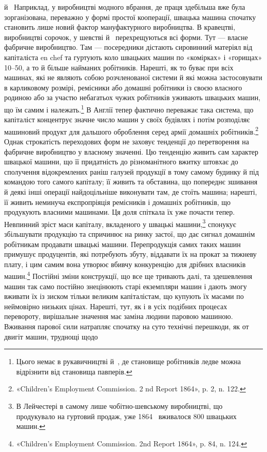 \parcont{}  %
й~ Наприклад, у виробництві модного вбрання, де праця
здебільша вже була зорганізована, переважно у формі простої
кооперації, швацька машина спочатку становить лише новий
фактор мануфактурного виробництва. В кравецтві, виробництві
сорочок, у шевстві й~ перехрещуються всі форми. Тут —
власне фабричне виробництво. Там — посередники дістають сировинний
матеріял від капіталіста en chef та гуртують коло швацьких
машин по «комірках» і «горищах» 10--50, а то й більше найманих
робітників. Нарешті, як то буває при всіх машинах, які не
являють собою розчленованої системи й які можна застосовувати
в карликовому розмірі, ремісники або домашні робітники із
своєю власного родиною або за участю небагатьох чужих робітників
уживають швацьких машин, що їм самим і належать.\footnote{
Цього немає в рукавичництві й~, де становище робітників
ледве можна відрізнити від становища павперів.
}
В Англії тепер фактично переважає така система, що капіталіст
концентрує значне число машин у своїх будівлях і потім розподіляє
машиновий продукт для дальшого оброблення серед армії
домашніх робітників.\footnote{
«Children’s Employment Commission. 2 nd Report 1864», p. 2,
n. 122.
} Однак строкатість переходових форм
не заховує тенденції до перетворення на фабричне виробництво
у власному значенні. Цю тенденцію живить сам характер швацької
машини, що її придатність до різноманітного вжитку штовхає
до сполучення відокремлених раніш галузей продукції в
тому самому будинку й під командою того самого капіталу; її
живить та обставина, що попереднє зшивання й деякі інші операції
найдоцільніше виконувати там, де стоїть машина; нарешті,
її живить неминуча експропріяція ремісників і домашніх робітників,
що продукують власними машинами. Ця доля спіткала
їх уже почасти тепер. Невпинний зріст маси капіталу, вкладеного
у швацькі машини,\footnote{
В Лейчестері в самому лише чобітно-шевському виробництві,
що продукувало на гуртовий продаж, уже 1864~ вживалося 800 швацьких
машин.
} спонукує збільшувати продукцію та спричинює
на ринку застої, що дає сигнал домашнім робітникам продавати
швацькі машини. Перепродукція самих таких машин примушує
продуцентів, які потребують збуту, віддавати їх на прокат
за тижневу плату, і цим самим вона утворює вбивчу конкуренцію
для дрібних власників машин.\footnote{
«Children’s Employment Commission. 2nd Report 1864», p. 84,
n. 124.
} Постійні зміни конструкції,
що все ще тривають далі, та здешевлення машин так само постійно
знецінюють старі екземпляри машин і дають змогу вживати їх
із зиском тільки великим капіталістам, що купують їх масами
по неймовірно низьких цінах. Нарешті, тут, як і в усіх подібних
процесах перевороту, вирішальне значення має заміна людини
паровою машиною. Вживання парової сили натрапляє спочатку
на суто технічні перешкоди, як от двигіт машин, труднощі щодо
\parbreak{}  %
